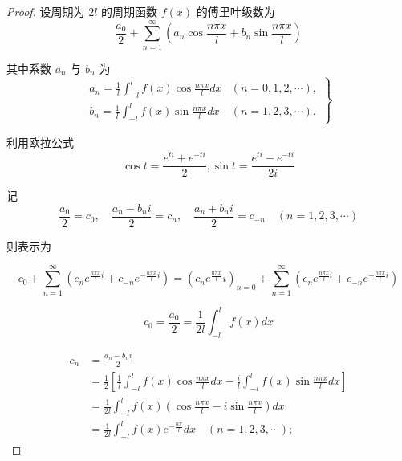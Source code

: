 \begin{proof}
    设周期为 $ 2 l $ 的周期函数 $ f(x) $ 的傅里叶级数为
\begin{equation}
\frac{a_{0}}{2}+\sum_{n=1}^{\infty}\left(a_{n} \cos \frac{n \pi x}{l}+b_{n} \sin \frac{n \pi x}{l}\right)
\end{equation}

其中系数 $ a_{n} $ 与 $ b_{n} $ 为
\begin{equation}
\left.\begin{array}{ll}
a_{n}=\frac{1}{l} \int_{-l}^{l} f(x) \cos \frac{n \pi x}{l} {d} x & (n=0,1,2, \cdots), \\
b_{n}=\frac{1}{l} \int_{-l}^{l} f(x) \sin \frac{n \pi x}{l} {d} x & (n=1,2,3, \cdots) .
\end{array}\right\}
\end{equation}

利用欧拉公式
\begin{equation} \cos t=\frac{{e}^{{ti}}+{e}^{-t i}}{2}, \sin t=\frac{{e}^{t {i}}-{e}^{-t {i}}}{2 {i}} \end{equation}

记
\begin{equation}
\frac{a_{0}}{2}=c_{0}, \quad \frac{a_{n}-b_{n} {i}}{2}=c_{n}, \quad \frac{a_{n}+b_{n} {i}}{2}=c_{-n} \quad(n=1,2,3, \cdots)
\end{equation}

则表示为

\begin{equation} c_{0}+\sum_{n=1}^{\infty}\left(c_{n} {e}^{\frac{n \pi x}{l} i}+c_{-n} {e}^{-\frac{n \pi x}{l} i}\right) =\left(c_{n} {e}^{\frac{n \pi x}{l}}i\right)_{n=0}+\sum_{n=1}^{\infty}\left(c_{n} {e}^{\frac{n \pi x}{l}i}+c_{-n} {e}^{-\frac{n \pi x}{l}i}\right) \end{equation}

\begin{equation} c_{0}=\frac{a_{0}}{2}=\frac{1}{2 l} \int_{-l}^{l} f(x) {d} x \end{equation}

\begin{equation}
\begin{aligned}
   c_{n} &=\frac{a_{n}-b_{n} i}{2}  \\
   &=\frac{1}{2}\left[\frac{1}{l} \int_{-l}^{l} f(x) \cos \frac{n \pi x}{l} {d} x-\frac{{i}}{l} \int_{-l}^{l} f(x) \sin \frac{n \pi x}{l} {d} x\right] \\
   &=\frac{1}{2 l} \int_{-l}^{l} f(x)\left(\cos \frac{n \pi x}{l}-{i} \sin \frac{n \pi x}{l}\right) {d} x\\
   &=\frac{1}{2 l} \int_{-l}^{l} f(x) {e}^{-\frac{n \pi}{l}} {d} x \quad(n=1,2,3, \cdots) ;
\end{aligned}
\end{equation}


\end{proof}
